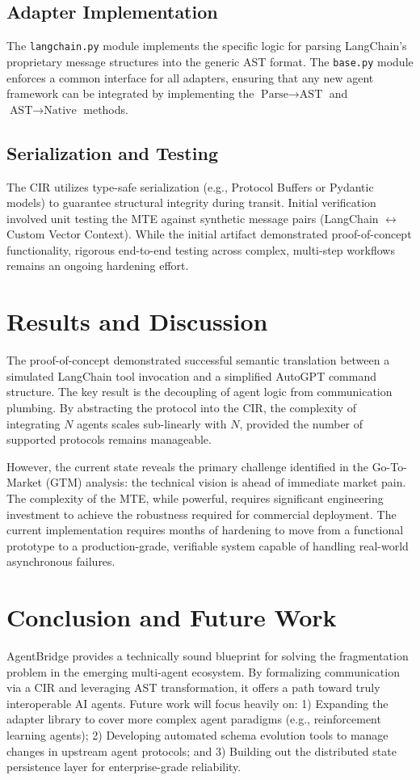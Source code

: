 \documentclass[11pt,a4paper]{article}
\begin{document}
\subsection{Adapter Implementation}
The \texttt{langchain.py} module implements the specific logic for parsing LangChain's proprietary message structures into the generic AST format. The \texttt{base.py} module enforces a common interface for all adapters, ensuring that any new agent framework can be integrated by implementing the $\text{Parse} \rightarrow \text{AST}$ and $\text{AST} \rightarrow \text{Native}$ methods.

\subsection{Serialization and Testing}
The CIR utilizes type-safe serialization (e.g., Protocol Buffers or Pydantic models) to guarantee structural integrity during transit. Initial verification involved unit testing the MTE against synthetic message pairs (LangChain $\leftrightarrow$ Custom Vector Context). While the initial artifact demonstrated proof-of-concept functionality, rigorous end-to-end testing across complex, multi-step workflows remains an ongoing hardening effort.

\section{Results and Discussion}
The proof-of-concept demonstrated successful semantic translation between a simulated LangChain tool invocation and a simplified AutoGPT command structure. The key result is the decoupling of agent logic from communication plumbing. By abstracting the protocol into the CIR, the complexity of integrating $N$ agents scales sub-linearly with $N$, provided the number of supported protocols remains manageable.

However, the current state reveals the primary challenge identified in the Go-To-Market (GTM) analysis: the technical vision is ahead of immediate market pain. The complexity of the MTE, while powerful, requires significant engineering investment to achieve the robustness required for commercial deployment. The current implementation requires months of hardening to move from a functional prototype to a production-grade, verifiable system capable of handling real-world asynchronous failures.

\section{Conclusion and Future Work}
AgentBridge provides a technically sound blueprint for solving the fragmentation problem in the emerging multi-agent ecosystem. By formalizing communication via a CIR and leveraging AST transformation, it offers a path toward truly interoperable AI agents. Future work will focus heavily on: 1) Expanding the adapter library to cover more complex agent paradigms (e.g., reinforcement learning agents); 2) Developing automated schema evolution tools to manage changes in upstream agent protocols; and 3) Building out the distributed state persistence layer for enterprise-grade reliability.



\end{document}
